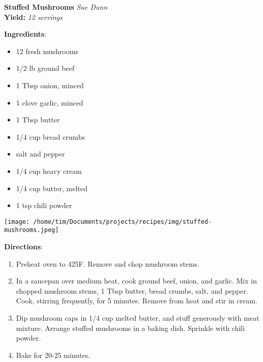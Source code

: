 \documentclass[11pt, twoside, openany]{book}
\begin{document}
\noindent\begin{minipage}[t]{\linewidth}%
{\Large\textbf{Stuffed Mushrooms}} \label{stuffed-mushrooms}\hfill\textit{Sue Dunn}\\
\textbf{Yield:} \textit{12 servings}\\
\noindent\begin{minipage}[t]{0.78\linewidth}%
\textbf{Ingredients}:\vspace{-3mm}
\begin{multicols}{2}
\begin{itemize}\setlength\itemsep{-1mm}
\item 12 fresh mushrooms
\item 1/2 lb ground beef
\item 1 Tbsp onion, minced
\item 1 clove garlic, minced
\item 1 Tbsp butter
\item 1/4 cup bread crumbs
\item salt and pepper
\item 1/4 cup heavy cream
\item 1/4 cup butter, melted
\item 1 tsp chili powder
\end{itemize}
\end{multicols}
\end{minipage}
\noindent\begin{minipage}[t]{0.18\linewidth}
\centering \strut\vspace*{-\baselineskip}\newline
\texttt{[image: /home/tim/Documents/projects/recipes/img/stuffed-mushrooms.jpeg]}\\
\end{minipage}\vspace{3mm}
\textbf{Directions}:
\vspace{-3mm}\begin{enumerate}\setlength\itemsep{-1mm}
\item Preheat oven to 425F. Remove and chop mushroom stems.
\item In a saucepan over medium heat, cook ground beef, onion, and garlic. Mix in chopped mushroom stems, 1 Tbsp butter, bread crumbs, salt, and pepper. Cook, stirring frequently, for 5 minutes. Remove from heat and stir in cream.
\item Dip mushroom caps in 1/4 cup melted butter, and stuff generously with meat mixture. Arrange stuffed mushrooms in a baking dish. Sprinkle with chili powder.
\item Bake for 20-25 minutes.
\end{enumerate}
\end{minipage}\vspace{8mm}
\end{document}
